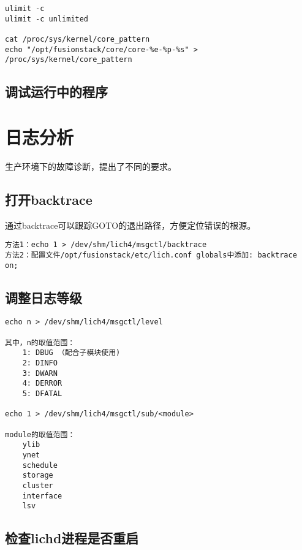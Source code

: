 \begin{lstlisting}
ulimit -c
ulimit -c unlimited

cat /proc/sys/kernel/core_pattern
echo "/opt/fusionstack/core/core-%e-%p-%s" > /proc/sys/kernel/core_pattern
\end{lstlisting}

\subsection{调试运行中的程序}

\section{日志分析}

生产环境下的故障诊断，提出了不同的要求。

\subsection{打开backtrace}

通过backtrace可以跟踪GOTO的退出路径，方便定位错误的根源。

\begin{lstlisting}
方法1：echo 1 > /dev/shm/lich4/msgctl/backtrace
方法2：配置文件/opt/fusionstack/etc/lich.conf globals中添加: backtrace on;
\end{lstlisting}

\subsection{调整日志等级}

\begin{lstlisting}
echo n > /dev/shm/lich4/msgctl/level

其中，n的取值范围：
    1: DBUG （配合子模块使用)
    2: DINFO
    3: DWARN
    4: DERROR
    5: DFATAL

echo 1 > /dev/shm/lich4/msgctl/sub/<module>

module的取值范围：
    ylib
    ynet
    schedule
    storage
    cluster
    interface
    lsv
\end{lstlisting}


\subsection{检查lichd进程是否重启}


